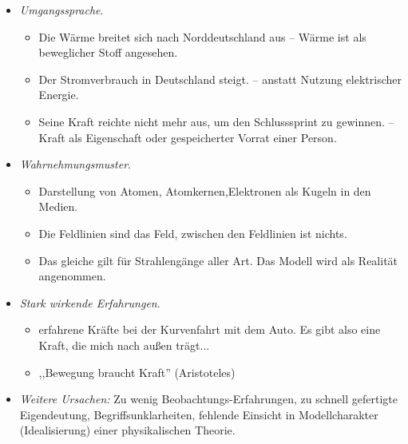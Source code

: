 \begin{itemize}
\item
\emph{Umgangssprache}. \begin{beisp}
	\begin{itemize}
		\item {\glqq}Die W{\"a}rme breitet sich nach Norddeutschland aus{\grqq} --  W{\"a}rme ist als beweglicher Stoff angesehen.
		\item {\glqq}Der Stromverbrauch in Deutschland steigt.{\grqq} --  anstatt Nutzung elektrischer Energie.
		\item {\glqq}Seine Kraft reichte nicht mehr aus, um den Schlusssprint zu gewinnen.{\grqq} -- Kraft als Eigenschaft oder gespeicherter Vorrat einer Person. 
	\end{itemize}
\end{beisp}
\item
\emph{Wahrnehmungsmuster}. \begin{beisp}
	\begin{itemize}
		\item Darstellung von Atomen, Atomkernen,Elektronen als Kugeln in den Medien.
		\item Die Feldlinien sind das Feld, zwischen den Feldlinien ist nichts.
		\item Das gleiche gilt f{\"u}r Strahleng{\"a}nge aller Art. Das Modell wird  als Realit{\"a}t angenommen.
	\end{itemize}
\end{beisp}
\item
\emph{Stark wirkende Erfahrungen}. \begin{beisp}
	\begin{itemize}
		\item erfahrene Kr{\"a}fte bei der Kurvenfahrt mit dem Auto. Es gibt also eine Kraft, die mich nach au{\ss}en tr{\"a}gt...
		\item ,,Bewegung braucht Kraft'' (Aristoteles)
	\end{itemize}
\end{beisp}
\item
\emph{Weitere Ursachen:} Zu wenig Beobachtungs-Erfahrungen, zu schnell gefertigte Eigendeutung, Begriffsunklarheiten, fehlende Einsicht in Modellcharakter (Idealisierung) einer physikalischen Theorie. 
\end{itemize}


